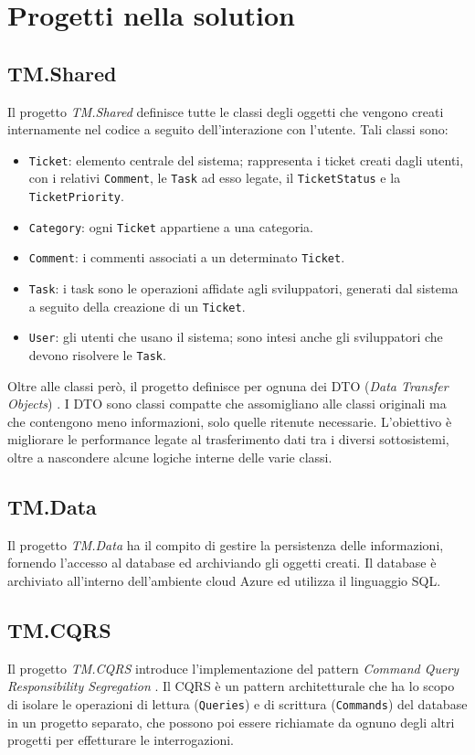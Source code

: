 \section{Progetti nella solution}

\subsection{TM.Shared}
Il progetto \textit{TM.Shared} definisce tutte le classi degli oggetti che vengono creati internamente nel codice a seguito dell'interazione
con l'utente. Tali classi sono:
\begin{itemize}
    \item \texttt{Ticket}: elemento centrale del sistema; rappresenta i ticket creati dagli utenti, con i relativi \texttt{Comment},
        le \texttt{Task} ad esso legate, il \texttt{TicketStatus} e la \texttt{TicketPriority}.
    \item \texttt{Category}: ogni \texttt{Ticket} appartiene a una categoria.
    \item \texttt{Comment}: i commenti associati a un determinato \texttt{Ticket}.
    \item \texttt{Task}: i task sono le operazioni affidate agli sviluppatori, generati dal sistema a seguito della creazione
        di un \texttt{Ticket}.
    \item \texttt{User}: gli utenti che usano il sistema; sono intesi anche gli sviluppatori che devono risolvere le \texttt{Task}.
\end{itemize}
Oltre alle classi però, il progetto definisce per ognuna dei DTO (\textit{Data Transfer Objects}) \cite{microsoft_webapi_ef_part5}.
I DTO sono classi compatte che assomigliano alle classi originali ma che contengono meno informazioni, solo quelle ritenute necessarie.
L'obiettivo è migliorare le performance legate al trasferimento dati tra i diversi sottosistemi, oltre a nascondere alcune logiche interne delle varie classi.

\subsection{TM.Data}
Il progetto \textit{TM.Data} ha il compito di gestire la persistenza delle informazioni, fornendo l'accesso al database
ed archiviando gli oggetti creati. Il database è archiviato all'interno dell'ambiente cloud Azure ed utilizza il linguaggio SQL.

\subsection{TM.CQRS}
Il progetto \textit{TM.CQRS} introduce l'implementazione del pattern \textit{Command Query Responsibility Segregation} \cite{azure_cqrs_msdocs}.
Il CQRS è un pattern architetturale che ha lo scopo di isolare le operazioni di lettura (\texttt{Queries}) e di scrittura (\texttt{Commands})
del database in un progetto separato, che possono poi essere richiamate da ognuno degli altri progetti per effetturare le interrogazioni.


